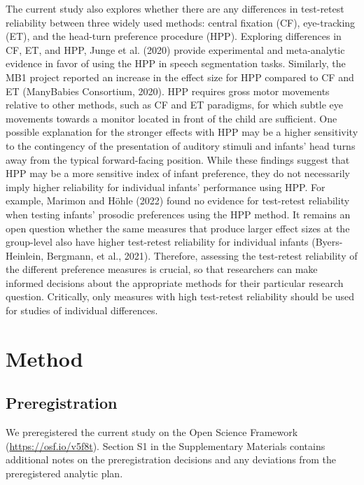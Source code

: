 \documentclass[
  man,floatsintext]{apa6}
\begin{document}
The current study also explores whether there are any differences in test-retest reliability between three widely used methods: central fixation (CF), eye-tracking (ET), and the head-turn preference procedure (HPP).
Exploring differences in CF, ET, and HPP, Junge et al. (2020) provide experimental and meta-analytic evidence in favor of using the HPP in speech segmentation tasks.
Similarly, the MB1 project reported an increase in the effect size for HPP compared to CF and ET (ManyBabies Consortium, 2020).
HPP requires gross motor movements relative to other methods, such as CF and ET paradigms, for which subtle eye movements towards a monitor located in front of the child are sufficient.
One possible explanation for the stronger effects with HPP may be a higher sensitivity to the contingency of the presentation of auditory stimuli and infants' head turns away from the typical forward-facing position.
While these findings suggest that HPP may be a more sensitive index of infant preference, they do not necessarily imply higher reliability for individual infants' performance using HPP.
For example, Marimon and Höhle (2022) found no evidence for test-retest reliability when testing infants' prosodic preferences using the HPP method.
It remains an open question whether the same measures that produce larger effect sizes at the group-level also have higher test-retest reliability for individual infants (Byers-Heinlein, Bergmann, et al., 2021).
Therefore, assessing the test-retest reliability of the different preference measures is crucial, so that researchers can make informed decisions about the appropriate methods for their particular research question.
Critically, only measures with high test-retest reliability should be used for studies of individual differences.

\hypertarget{method}{%
\section{Method}\label{method}}

\hypertarget{preregistration}{%
\subsection{Preregistration}\label{preregistration}}

We preregistered the current study on the Open Science Framework (\url{https://osf.io/v5f8t}). Section S1 in the Supplementary Materials contains additional notes on the preregistration decisions and any deviations from the preregistered analytic plan.
\end{document}
